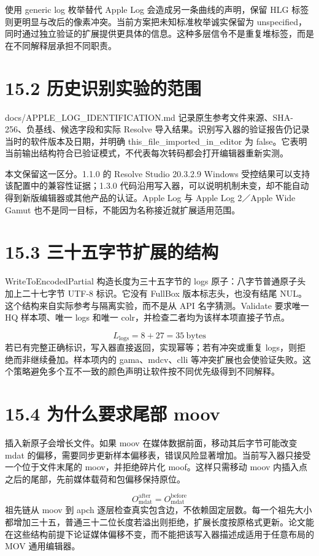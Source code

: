 \documentclass[UTF8,zihao=-4,openany]{ctexbook}
\begin{document}
使用 generic log 枚举替代 Apple Log 会造成另一条曲线的声明，保留 HLG 标签则更明显与改后的像素冲突。当前方案把未知标准枚举诚实保留为 unspecified，同时通过独立验证的扩展提供更具体的信息。这种多层信令不是重复堆标签，而是在不同解释层承担不同职责。


\section*{15.2 历史识别实验的范围}
docs/APPLE\_LOG\_IDENTIFICATION.md 记录原生参考文件来源、SHA-256、负基线、候选字段和实际 Resolve 导入结果。识别写入器的验证报告仍记录当时的软件版本及日期，并明确 this\_file\_imported\_in\_editor 为 false。它表明当前输出结构符合已验证模式，不代表每次转码都会打开编辑器重新实测。

本文保留这一区分。1.1.0 的 Resolve Studio 20.3.2.9 Windows 受控结果可以支持该配置中的兼容性证据；1.3.0 代码沿用写入器，可以说明机制未变，却不能自动得到新版编辑器或其他产品的认证。Apple Log 与 Apple Log 2／Apple Wide Gamut 也不是同一目标，不能因为名称接近就扩展适用范围。


\section*{15.3 三十五字节扩展的结构}
WriteToEncodedPartial 构造长度为三十五字节的 logs 原子：八字节普通原子头加上二十七字节 UTF-8 标识。它没有 FullBox 版本标志头，也没有结尾 NUL。这个结构来自实际参考与隔离实验，而不是从 API 名字猜测。Validate 要求唯一 HQ 样本项、唯一 logs 和唯一 colr，并检查二者均为该样本项直接子节点。


\begin{equation}
L_{\mathrm{logs}}=8+27=35\ \mathrm{bytes}
\end{equation}
若已有完整正确标识，写入器直接返回，实现幂等；若有冲突或重复 logs，则拒绝而非继续叠加。样本项内的 gama、mdcv、clli 等冲突扩展也会使验证失败。这个策略避免多个互不一致的颜色声明让软件按不同优先级得到不同解释。


\section*{15.4 为什么要求尾部 moov}
插入新原子会增长文件。如果 moov 在媒体数据前面，移动其后字节可能改变 mdat 的偏移，需要同步更新样本偏移表，错误风险显著增加。当前写入器只接受一个位于文件末尾的 moov，并拒绝碎片化 moof。这样只需移动 moov 内插入点之后的尾部，先前媒体载荷和包偏移保持原位。


\begin{equation}
O_{\mathrm{mdat}}^{\mathrm{after}}=O_{\mathrm{mdat}}^{\mathrm{before}}
\end{equation}
祖先链从 moov 到 apch 逐层检查真实包含边，不依赖固定层数。每一个祖先大小都增加三十五，普通三十二位长度若溢出则拒绝，扩展长度按原格式更新。论文能在这些结构前提下论证媒体偏移不变，而不能把该写入器描述成适用于任意布局的 MOV 通用编辑器。
\end{document}
